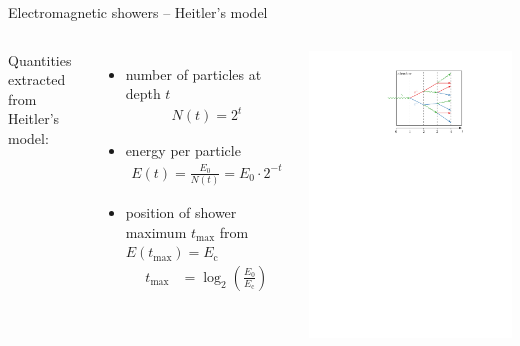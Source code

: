 \documentclass[11pt,xcolor=dvipsnames,professionalfonts,notes]{beamer}
\begin{document}
\begin{frame}{Electromagnetic showers -- Heitler's model}
	\begin{columns}
		Quantities extracted from Heitler's model:
		\begin{itemize}
			\setlength\itemsep{1.em}
			\item number of particles at depth $t$
			\begin{align*}
				N(t) = 2^t
			\end{align*}
			
			\item energy per particle
			\begin{align*}
				E(t) = \frac{E_0}{N(t)} = E_0 \cdot 2^{-t}
			\end{align*}
			
			\item position of shower maximum $t_\mathrm{max}$ from $E(t_\mathrm{max}) = E_\mathrm{c}$
			\begin{align*}
				t_\mathrm{max} &= \log_2\left(\frac{E_0}{E_\mathrm{c}}\right)
			\end{align*}
		\end{itemize}
		
		\begin{center}
			\includegraphics[width=1.0\textwidth]{./figures/shower_cascadeunits.pdf}
		\end{center}
	\end{columns}
\end{frame}
\end{document}
